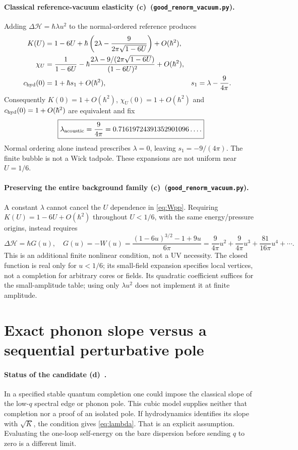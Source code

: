 \documentclass[11pt,a4paper]{article}
\newcommand{\C}{\textbf{(c)}\ }
\newcommand{\D}{\textbf{(d)}\ }
\newcommand{\file}[1]{\nolinkurl{#1}}
\newcommand{\vac}{\file{good_renorm_vacuum.py}}
\begin{document}
\paragraph{Classical reference-vacuum elasticity \C (\vac).}
Adding $\Delta\mathcal H=\hbar\lambda u^2$ to the normal-ordered reference
produces
\begin{align}
 K(U)&=1-6U+\hbar\left(2\lambda-
       \frac9{2\pi\sqrt{1-6U}}\right)+O(\hbar^2),\\
 \chi_U&=\frac1{1-6U}-\hbar
 \frac{2\lambda-9/(2\pi\sqrt{1-6U})}{(1-6U)^2}+O(\hbar^2),\\
 c_{\rm hyd}(0)&=1+\hbar s_1+O(\hbar^2),
 &s_1&=\lambda-\frac9{4\pi}.\label{eq:s1}
\end{align}
Consequently $K(0)=1+O(\hbar^2)$, $\chi_U(0)=1+O(\hbar^2)$ and
$c_{\rm hyd}(0)=1+O(\hbar^2)$ are equivalent and fix
\begin{equation}
 \boxed{\lambda_{\rm acoustic}=\frac9{4\pi}
 =0.71619724391352901096\ldots .}\label{eq:lambda}
\end{equation}
Normal ordering alone instead prescribes $\lambda=0$, leaving
$s_1=-9/(4\pi)$. The finite bubble is not a Wick tadpole.
These expansions are not uniform near $U=1/6$.

\paragraph{Preserving the entire background family \C (\vac).}
A constant $\lambda$ cannot cancel the $U$ dependence in \eqref{eq:Wpp}.
Requiring $K(U)=1-6U+O(\hbar^2)$ throughout $U<1/6$, with the same
energy/pressure origins, instead requires
\begin{equation}
 \Delta\mathcal H=\hbar G(u),\quad
 G(u)=-W(u)=\frac{(1-6u)^{3/2}-1+9u}{6\pi}
 =\frac9{4\pi}u^2+\frac9{4\pi}u^3+\frac{81}{16\pi}u^4+\cdots .
 \label{eq:G}
\end{equation}
This is an additional finite nonlinear condition, not a UV necessity.
The closed function is real only for $u<1/6$; its small-field expansion
specifies local vertices, not a completion for arbitrary cores or fields.
Its quadratic coefficient suffices for the small-amplitude table; using
only $\lambda u^2$ does not implement it at finite amplitude.

\section{Exact phonon slope versus a sequential perturbative pole}
\label{sec:pole}
\paragraph{Status of the candidate \D.}
In a specified stable quantum completion one could impose the classical
slope of the low-$q$ spectral edge or phonon pole. This cubic model supplies
neither that completion nor a proof of an isolated pole. If hydrodynamics
identifies its slope with $\sqrt K$, the condition gives \eqref{eq:lambda}.
That is an explicit assumption. Evaluating the one-loop self-energy on
the bare dispersion before sending $q$ to zero is a different limit.
\end{document}
